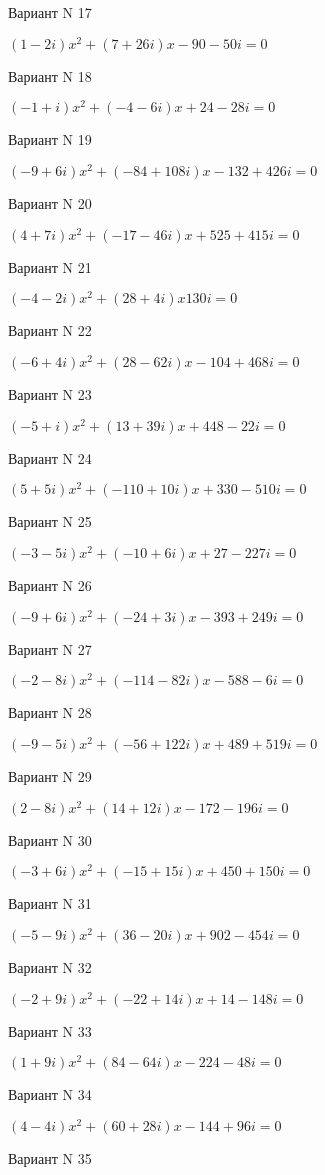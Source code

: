 \documentclass[11pt]{report}
\begin{document}
Вариант N 17

$(1 - 2 i)x^2 + (7 + 26 i)x  -90 - 50 i = 0$

Вариант N 18

$(-1 + i)x^2 + (-4 - 6 i)x + 24 - 28 i = 0$

Вариант N 19

$(-9 + 6 i)x^2 + (-84 + 108 i)x  -132 + 426 i = 0$

Вариант N 20

$(4 + 7 i)x^2 + (-17 - 46 i)x + 525 + 415 i = 0$

Вариант N 21

$(-4 - 2 i)x^2 + (28 + 4 i)x  130 i = 0$

Вариант N 22

$(-6 + 4 i)x^2 + (28 - 62 i)x  -104 + 468 i = 0$

Вариант N 23

$(-5 + i)x^2 + (13 + 39 i)x + 448 - 22 i = 0$

Вариант N 24

$(5 + 5 i)x^2 + (-110 + 10 i)x + 330 - 510 i = 0$

Вариант N 25

$(-3 - 5 i)x^2 + (-10 + 6 i)x + 27 - 227 i = 0$

Вариант N 26

$(-9 + 6 i)x^2 + (-24 + 3 i)x  -393 + 249 i = 0$

Вариант N 27

$(-2 - 8 i)x^2 + (-114 - 82 i)x  -588 - 6 i = 0$

Вариант N 28

$(-9 - 5 i)x^2 + (-56 + 122 i)x + 489 + 519 i = 0$

Вариант N 29

$(2 - 8 i)x^2 + (14 + 12 i)x  -172 - 196 i = 0$

Вариант N 30

$(-3 + 6 i)x^2 + (-15 + 15 i)x + 450 + 150 i = 0$

Вариант N 31

$(-5 - 9 i)x^2 + (36 - 20 i)x + 902 - 454 i = 0$

Вариант N 32

$(-2 + 9 i)x^2 + (-22 + 14 i)x + 14 - 148 i = 0$

Вариант N 33

$(1 + 9 i)x^2 + (84 - 64 i)x  -224 - 48 i = 0$

Вариант N 34

$(4 - 4 i)x^2 + (60 + 28 i)x  -144 + 96 i = 0$

Вариант N 35
\end{document}
